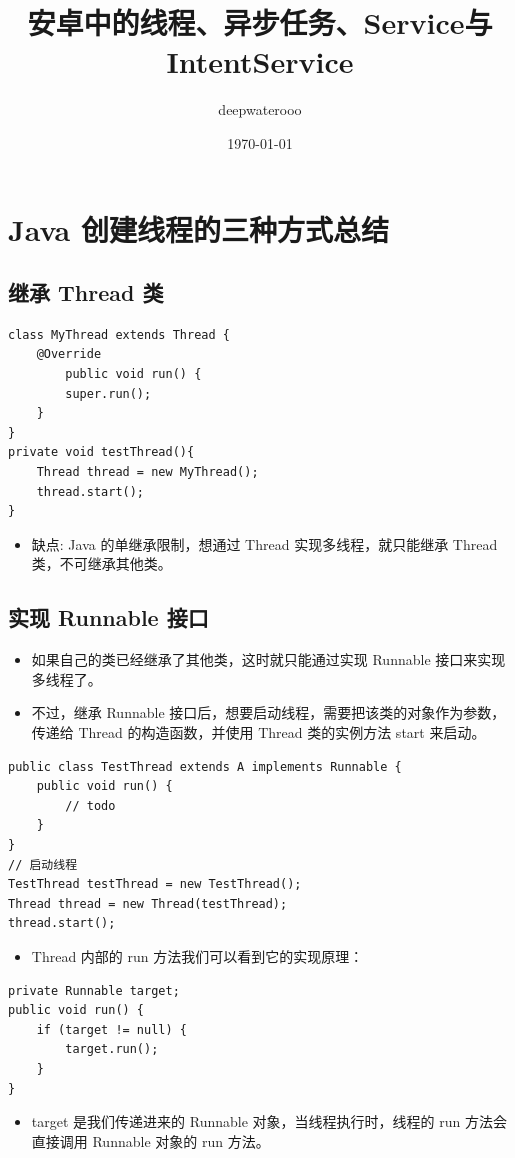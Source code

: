 \documentclass[9pt, b5paper]{article}
\author{deepwaterooo}
\date{\today}
\title{安卓中的线程、异步任务、Service与IntentService}
\begin{document}
\maketitle
\tableofcontents


\section{Java 创建线程的三种方式总结}
\label{sec-1}
\subsection{继承 Thread 类}
\label{sec-1-1}
\begin{verbatim}
class MyThread extends Thread {
    @Override
        public void run() {
        super.run();
    }
}
private void testThread(){
    Thread thread = new MyThread();
    thread.start();
}
\end{verbatim}
\begin{itemize}
\item 缺点: Java 的单继承限制，想通过 Thread 实现多线程，就只能继承 Thread 类，不可继承其他类。
\end{itemize}
\subsection{实现 Runnable 接口}
\label{sec-1-2}
\begin{itemize}
\item 如果自己的类已经继承了其他类，这时就只能通过实现 Runnable 接口来实现多线程了。
\item 不过，继承 Runnable 接口后，想要启动线程，需要把该类的对象作为参数，传递给 Thread 的构造函数，并使用 Thread 类的实例方法 start 来启动。
\end{itemize}
\begin{verbatim}
public class TestThread extends A implements Runnable {
    public void run() {
        // todo
    }
}
// 启动线程
TestThread testThread = new TestThread();
Thread thread = new Thread(testThread);
thread.start();
\end{verbatim}
\begin{itemize}
\item Thread 内部的 run 方法我们可以看到它的实现原理：
\end{itemize}
\begin{verbatim}
private Runnable target;
public void run() {
    if (target != null) {
        target.run();
    }
}
\end{verbatim}
\begin{itemize}
\item target 是我们传递进来的 Runnable 对象，当线程执行时，线程的 run 方法会直接调用 Runnable 对象的 run 方法。
\end{itemize}
\end{document}
